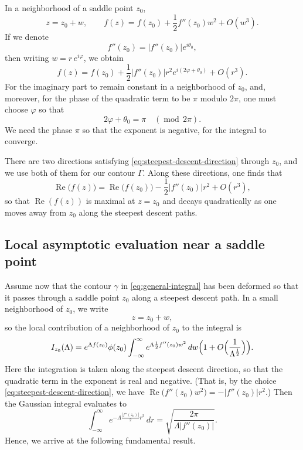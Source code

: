 \documentclass[letterpaper,11pt,oneside,reqno]{article}
\numberwithin{equation}{section}
\theoremstyle{definition}
\begin{document}
In a neighborhood of a saddle point $z_0$,
\[
	z=z_0+w,
	\qquad
	f(z)=f(z_0)+\frac{1}{2}f''(z_0)w^2 + O(w^3).
\]
If we denote
\[
	f''(z_0)=|f''(z_0)|e^{i\theta_0},
\]
then writing $w=r\,e^{i\varphi}$, we obtain
\[
	f(z)=f(z_0)+\frac{1}{2}|f''(z_0)|r^2e^{i(2\varphi+\theta_0)}+O(r^3).
\]
For the imaginary part to remain constant in a neighborhood
of $z_0$, and, moreover,
for the phase of the quadratic term to be $\pi$ modulo $2\pi$, one must choose $\varphi$ so that
\begin{equation}
	\label{eq:steepest-descent-direction}
	2\varphi+\theta_0=\pi \quad (\operatorname{mod}\,2\pi).
\end{equation}
We need the phase $\pi$ so that the exponent is negative, for the integral to converge.

There are two directions satisfying \eqref{eq:steepest-descent-direction}
through $z_0$, and we use both of them for our contour $\Gamma$.
Along these directions, one finds that
\[
	\operatorname{Re}\bigl(f(z)\bigr)=\operatorname{Re}\bigl(f(z_0)\bigr)-\frac{1}{2}|f''(z_0)|r^2+O(r^3),
\]
so that $\operatorname{Re}(f(z))$ is maximal at $z=z_0$ and decays quadratically as one moves away from $z_0$ along the steepest descent paths.

\subsection{Local asymptotic evaluation near a saddle point}

Assume now that the contour $\gamma$ in \eqref{eq:general-integral} has been deformed so that it passes through a saddle point $z_0$ along a steepest descent path. In a small neighborhood of $z_0$, we write
\[
	z=z_0+w,
\]
so the local contribution of a neighborhood of $z_0$ to the integral is
\begin{equation}
	\label{eq:local-contribution}
	I_{z_0}(\Lambda)=e^{\Lambda f(z_0)}\phi(z_0)
	\int_{-\infty}^{\infty} e^{\Lambda\frac{1}{2}f''(z_0)w^2}\,dw
	\Bigl(1+O\Bigl(\frac{1}{\Lambda^{\frac12}}\Bigr)\Bigr).
\end{equation}
Here the integration is taken along the steepest descent direction, so that the quadratic term in the exponent is real and negative. (That is, by the choice \eqref{eq:steepest-descent-direction}, we have $\operatorname{Re}\bigl(f''(z_0)w^2\bigr)=-|f''(z_0)|r^2$.) Then the Gaussian integral evaluates to
\[
	\int_{-\infty}^{\infty} e^{-\Lambda\frac{|f''(z_0)|}{2}r^2}\,dr
	=\sqrt{\frac{2\pi}{\Lambda |f''(z_0)|}}.
\]
Hence, we
arrive at the following fundamental result.
\end{document}
